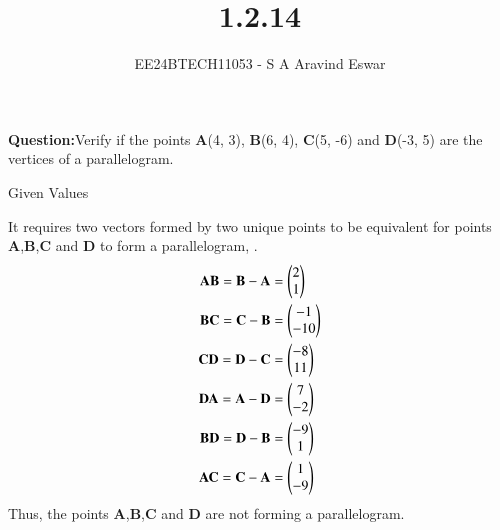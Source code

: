 \documentclass[journal]{IEEEtran}
\begin{document}

\vspace{3cm}

\title{1.2.14}
\author{EE24BTECH11053 - S A Aravind Eswar
}
{\let\newpage\relax\maketitle}

\renewcommand{\thefigure}{\theenumi}
\renewcommand{\thetable}{\theenumi}
\setlength{\intextsep}{10pt} %


\renewcommand{\thetable}{\theenumi}

\textbf{Question:}Verify if the points \textbf{A}(4, 3), \textbf{B}(6, 4), \textbf{C}(5, -6) and \textbf{D}(-3, 5) are the vertices of a
parallelogram.\\
\solution 
\begin{table}[h]
	\centering
	
	\caption{Given Values}
	\label{tab:1}
\end{table}

It requires two vectors formed by two unique points to be equivalent for points \textbf{A},\textbf{B},\textbf{C} and \textbf{D} to form a parallelogram, .
\begin{align}\textbf{AB} = \textbf{B}-\textbf{A} &= \begin{pmatrix}2\\1\end{pmatrix}\\\textbf{BC} = \textbf{C}-\textbf{B} &= \begin{pmatrix}-1\\-10\end{pmatrix}\\\textbf{CD} =\textbf{D}-\textbf{C} &=\begin{pmatrix}-8\\11\end{pmatrix}\\\textbf{DA} = \textbf{A}-\textbf{D} &= \begin{pmatrix}7\\-2\end{pmatrix}\\\textbf{BD} = \textbf{D}-\textbf{B} &= \begin{pmatrix}-9\\1\end{pmatrix}\\\textbf{AC} = \textbf{C}-\textbf{A} &= \begin{pmatrix}1\\-9\end{pmatrix}\end{align}
Thus, the points \textbf{A},\textbf{B},\textbf{C} and \textbf{D} are not forming a parallelogram.
\end{document}
